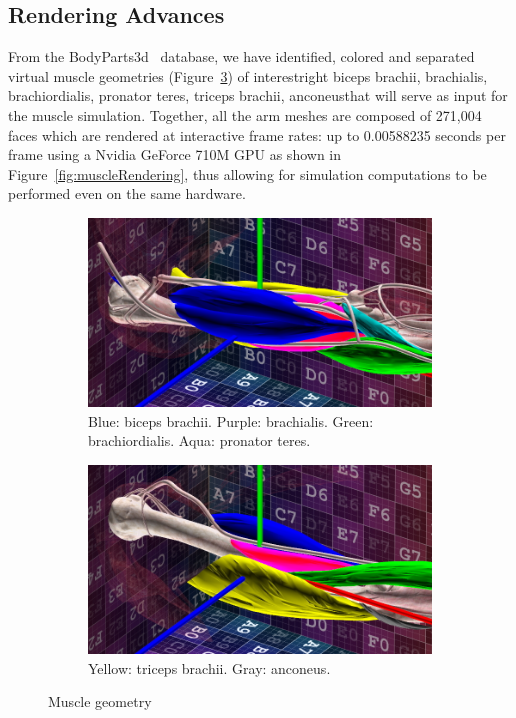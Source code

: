 \subsection{Rendering Advances}

From the BodyParts3d~\citep{bodyParts3d} database, we have identified, colored and separated virtual muscle geometries (Figure~\ref{fig:muscleView}) of interest\textemdash right biceps brachii, brachialis, brachiordialis, pronator teres, triceps brachii, anconeus\textemdash that will serve as input for the muscle simulation. Together, all the arm meshes are composed of 271,004 faces which are rendered at interactive frame rates: up to 0.00588235 seconds per frame using a Nvidia GeForce 710M GPU as shown in Figure~\ref{fig:muscleRendering}, thus allowing for simulation computations to be performed even on the same hardware.

\begin{figure}
    \centering
    \begin{subfigure}[t]{0.45\textwidth}
        \centering
        \includegraphics[width=\textwidth]{./Figures/musclesFront.jpg}
        \caption{Blue: biceps brachii. Purple: brachialis. Green: brachiordialis. Aqua: pronator teres.}
        \label{fig:musclesFront}
    \end{subfigure}
\hfill
    \begin{subfigure}[t]{0.45\textwidth}
        \centering
        \includegraphics[width=\textwidth]{./Figures/musclesBack.jpg}
        \caption{Yellow: triceps brachii. Gray: anconeus.}
        \label{fig:musclesBack}
    \end{subfigure}

    \caption{Muscle geometry}
    \label{fig:muscleView}
\end{figure}


